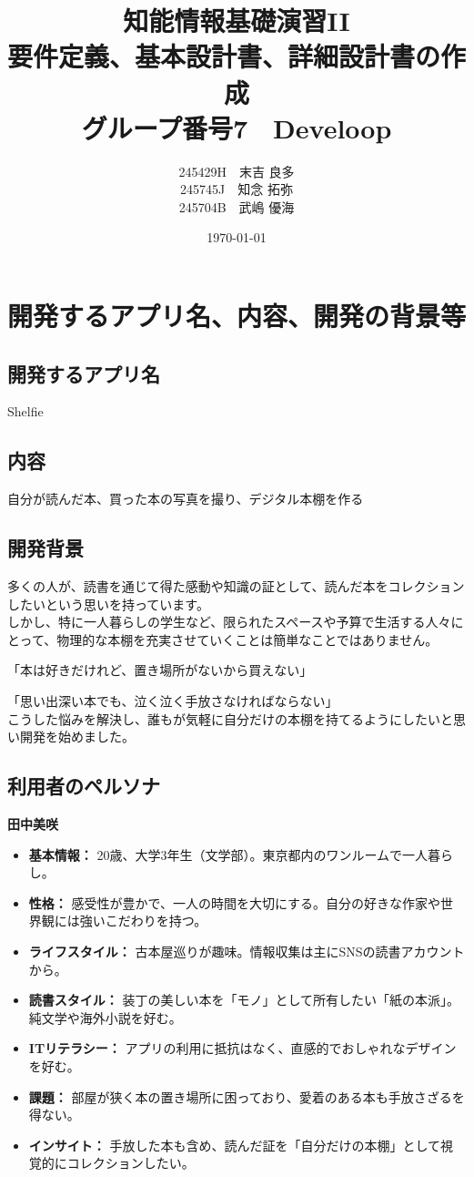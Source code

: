 \documentclass[a4paper, 11pt, titlepage]{jsarticle}
\title{知能情報基礎演習II \\ 要件定義、基本設計書、詳細設計書の作成 \\ グループ番号7　Develoop}
\author{245429H　末吉 良多 \\ 245745J　知念 拓弥 \\ 245704B　武嶋 優海}
\date{\today}
\begin{document}
\maketitle

\clearpage

\tableofcontents
\clearpage
\section{開発するアプリ名、内容、開発の背景等}
\subsection{開発するアプリ名}
Shelfie
\subsection{内容}
自分が読んだ本、買った本の写真を撮り、デジタル本棚を作る
\subsection{開発背景}
多くの人が、読書を通じて得た感動や知識の証として、読んだ本をコレクションしたいという思いを持っています。\\
しかし、特に一人暮らしの学生など、限られたスペースや予算で生活する人々にとって、物理的な本棚を充実させていくことは簡単なことではありません。

「本は好きだけれど、置き場所がないから買えない」

「思い出深い本でも、泣く泣く手放さなければならない」\\
こうした悩みを解決し、誰もが気軽に自分だけの本棚を持てるようにしたいと思い開発を始めました。

\subsection{利用者のペルソナ}
\textbf{田中美咲}
\begin{itemize}
    \item \textbf{基本情報：} 20歳、大学3年生（文学部）。東京都内のワンルームで一人暮らし。
    \item \textbf{性格：} 感受性が豊かで、一人の時間を大切にする。自分の好きな作家や世界観には強いこだわりを持つ。
    \item \textbf{ライフスタイル：} 古本屋巡りが趣味。情報収集は主にSNSの読書アカウントから。
    \item \textbf{読書スタイル：} 装丁の美しい本を「モノ」として所有したい「紙の本派」。純文学や海外小説を好む。
    \item \textbf{ITリテラシー：} アプリの利用に抵抗はなく、直感的でおしゃれなデザインを好む。
    \item \textbf{課題：} 部屋が狭く本の置き場所に困っており、愛着のある本も手放さざるを得ない。
    \item \textbf{インサイト：} 手放した本も含め、読んだ証を「自分だけの本棚」として視覚的にコレクションしたい。
\end{itemize}
\end{document}
